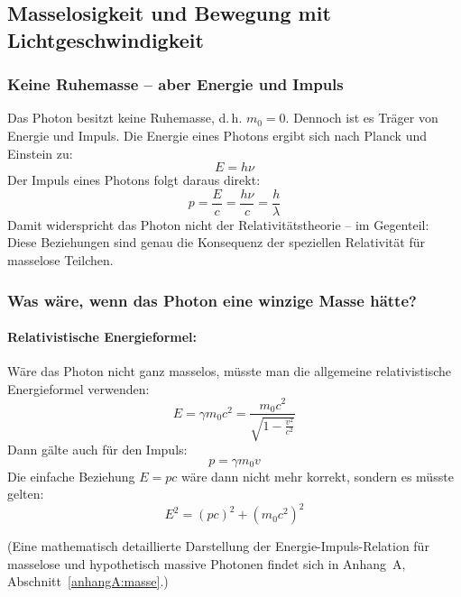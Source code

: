 \subsection{Masselosigkeit und Bewegung mit \newline Lichtgeschwindigkeit}

\subsubsection{Keine Ruhemasse -- aber Energie und Impuls}

Das Photon besitzt keine Ruhemasse, d.\,h. $m_0 = 0$. Dennoch ist es Tr\"ager von Energie und Impuls. Die Energie eines Photons ergibt sich nach Planck und Einstein zu:
\begin{equation}
	E = h \nu
\end{equation}
Der Impuls eines Photons folgt daraus direkt:
\begin{equation}
	p = \frac{E}{c} = \frac{h\nu}{c} = \frac{h}{\lambda}
\end{equation}
Damit widerspricht das Photon nicht der Relativit\"atstheorie -- im Gegenteil: Diese Beziehungen sind genau die Konsequenz der speziellen Relativit\"at f\"ur masselose Teilchen.

\subsubsection{Was w\"are, wenn das Photon eine winzige Masse h\"atte?}

\paragraph{Relativistische Energieformel:} W\"are das Photon nicht ganz masselos, m\"usste man die allgemeine relativistische Energieformel verwenden:
\begin{equation}
	E = \gamma m_0 c^2 = \frac{m_0 c^2}{\sqrt{1 - \frac{v^2}{c^2}}}
\end{equation}
Dann g\"alte auch f\"ur den Impuls:
\begin{equation}
	p = \gamma m_0 v
\end{equation}
Die einfache Beziehung $E = pc$ w\"are dann nicht mehr korrekt, sondern es m\"usste gelten:
\begin{equation}
	E^2 = (pc)^2 + (m_0 c^2)^2
\end{equation}

(Eine mathematisch detaillierte Darstellung der Energie-Impuls-Relation für masselose und hypothetisch massive Photonen findet sich in Anhang~A, Abschnitt~\ref{anhangA:masse}.)
\newpage
\noindent
